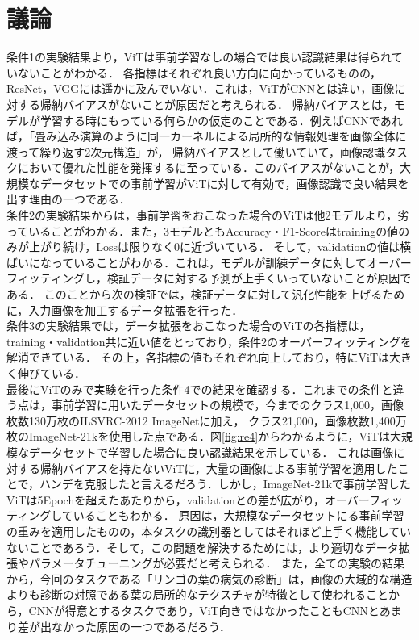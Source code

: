 \documentclass[a4paper, oneside, openany, dvipdfmx]{suribt}%
\newcommand{\fref}[1]{図\ref{#1}}
\begin{document}
\chapter{議論}
条件1の実験結果より，ViTは事前学習なしの場合では良い認識結果は得られていないことがわかる．
各指標はそれぞれ良い方向に向かっているものの，ResNet，VGGには遥かに及んでいない．これは，ViTがCNNとは違い，画像に対する帰納バイアスがないことが原因だと考えられる．
帰納バイアスとは，モデルが学習する時にもっている何らかの仮定のことである．例えばCNNであれば，「畳み込み演算のように同一カーネルによる局所的な情報処理を画像全体に渡って繰り返す2次元構造」が，
帰納バイアスとして働いていて，画像認識タスクにおいて優れた性能を発揮するに至っている．このバイアスがないことが，大規模なデータセットでの事前学習がViTに対して有効で，画像認識で良い結果を出す理由の一つである．\\
条件2の実験結果からは，事前学習をおこなった場合のViTは他2モデルより，劣っていることがわかる．また，3モデルともAccuracy・F1-Scoreはtrainingの値のみが上がり続け，Lossは限りなく0に近づいている．
そして，validationの値は横ばいになっていることがわかる．これは，モデルが訓練データに対してオーバーフィッティングし，検証データに対する予測が上手くいっていないことが原因である．
このことから次の検証では，検証データに対して汎化性能を上げるために，入力画像を加工するデータ拡張を行った．\\
条件3の実験結果では，データ拡張をおこなった場合のViTの各指標は，training・validation共に近い値をとっており，条件2のオーバーフィッティングを解消できている．
その上，各指標の値もそれぞれ向上しており，特にViTは大きく伸びている．\\
最後にViTのみで実験を行った条件4での結果を確認する．これまでの条件と違う点は，事前学習に用いたデータセットの規模で，今までのクラス1,000，画像枚数130万枚のILSVRC-2012 ImageNetに加え，
クラス21,000，画像枚数1,400万枚のImageNet-21kを使用した点である．\fref{fig:re4}からわかるように，ViTは大規模なデータセットで学習した場合に良い認識結果を示している．
これは画像に対する帰納バイアスを持たないViTに，大量の画像による事前学習を適用したことで，ハンデを克服したと言えるだろう．しかし，ImageNet-21kで事前学習したViTは5Epochを超えたあたりから，validationとの差が広がり，オーバーフィッティングしていることもわかる．
原因は，大規模なデータセットにる事前学習の重みを適用したものの，本タスクの識別器としてはそれほど上手く機能していないことであろう．そして，この問題を解決するためには，より適切なデータ拡張やパラメータチューニングが必要だと考えられる．
また，全ての実験の結果から，今回のタスクである「リンゴの葉の病気の診断」は，画像の大域的な構造よりも診断の対照である葉の局所的なテクスチャが特徴として使われることから，CNNが得意とするタスクであり，ViT向きではなかったこともCNNとあまり差が出なかった原因の一つであるだろう．
\end{document}
